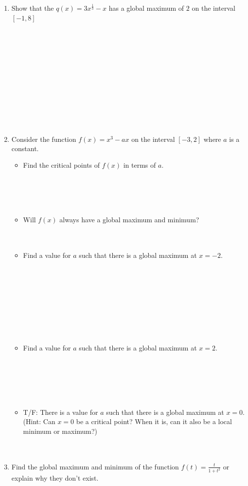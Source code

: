 \documentclass[12pt]{article}
\begin{document}
\begin{enumerate}
    \item Show that the $q(x)=3x^{\frac{1}{3}}-x$ has a global maximum of $2$ on the interval $[-1,8]$\\\\\\\\\\\\\\\\\\\\\\\\

    \item Consider the function $f(x)=x^3-ax$ on the interval $[-3,2]$ where $a$ is a constant.
    \begin{itemize}
        \item Find the critical points of $f(x)$ in terms of $a$.\\\\\\\\\\
        \item Will $f(x)$ always have a global maximum and minimum?\\\\\\
        \item Find a value for $a$ such that there is a global maximum at $x=-2$.\\\\\\\\\\\\\\\\\\
        \item Find a value for $a$ such that there is a global maximum at $x=2$.\\\\\\\\\\\\
        \item T/F: There is a value for $a$ such that there is a global maximum at $x=0$. (Hint: Can $x=0$ be a critical point? When it is, can it also be a local minimum or maximum?)\\\\\\
    \end{itemize}
    \item Find the global maximum and minimum of the function $\displaystyle{f(t)=\frac{t}{1+t^2}}$ or explain why they don't exist.\\
    

\end{enumerate}
\end{document}
